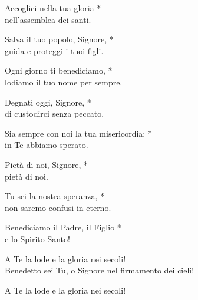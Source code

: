 \spazio

Accoglici nella tua gloria *\\
nell'assemblea dei santi.

\spazio

Salva il tuo popolo, Signore, *\\
guida e proteggi i tuoi figli.

\spazio

Ogni giorno ti benediciamo, *\\
lodiamo il tuo nome per sempre.

\spazio

Degnati oggi, Signore, *\\
di custodirci senza peccato.

\spazio

Sia sempre con noi la tua misericordia: *\\
in Te abbiamo sperato.

\spazio

Pietà di noi, Signore, *\\
pietà di noi.

\spazio

Tu sei la nostra speranza, *\\
non saremo confusi in eterno.

\spazio

Benediciamo il Padre, il Figlio *\\
e lo Spirito Santo!

\spazio

A Te la lode e la gloria nei secoli!\\
Benedetto sei Tu, o Signore nel firmamento dei cieli!

\spazio

A Te la lode e la gloria nei secoli!
